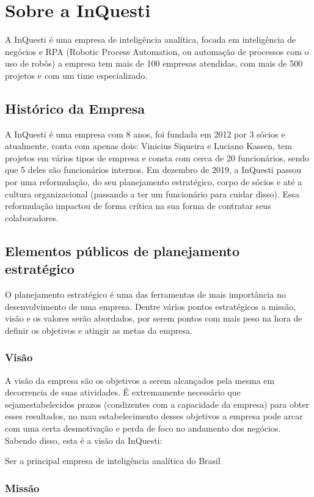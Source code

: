 \chapter{Sobre a InQuesti}
A InQuesti é uma empresa de inteligência analítica, focada em inteligência de negócios e RPA (Robotic Process Automation, ou automação de processos com o uso de robôs) a empresa tem mais de 100 empresas atendidas, com mais de 500 projetos e com um time especializado. 

\section{Histórico da Empresa}
A InQuesti é uma empresa com 8 anos, foi fundada em 2012 por 3 sócios e atualmente, conta com apenas dois: Vinicius Siqueira e Luciano Kassen, tem projetos em vários tipos de empresa e consta com cerca de 20 funcionários, sendo que 5 deles são funcionários internos. 
Em dezembro de 2019, a InQuesti passou por uma reformulação, do seu planejamento estratégico, corpo de sócios e até a cultura organizacional (passando a ter um funcionário para cuidar disso). Essa reformulação impactou de forma crítica na sua forma de contratar seus colaboradores.

\section{Elementos públicos de planejamento estratégico}
O planejamento estratégico é uma das ferramentas de mais importância no desenvolvimento de uma empresa. Dentre vários pontos estratégicos a missão, visão e os valores serão abordados, por serem pontos com mais peso na hora de definir os objetivos e atingir as metas da empresa.

\subsection{Visão}
A visão da empresa são os objetivos a serem alcançados pela mesma em decorrencia de suas atividades. É extremamente necessário que sejamestabelecidos prazos (condizentes com a capacidade da empresa) para obter esses resultados, no mau estabelecimento desses objetivos a empresa pode arcar com uma certa desmotivação e perda de foco no andamento dos negócios. Sabendo disso, esta é a visão da InQuesti:

Ser a principal empresa de inteligência analítica do Brasil

\subsection{Missão}

